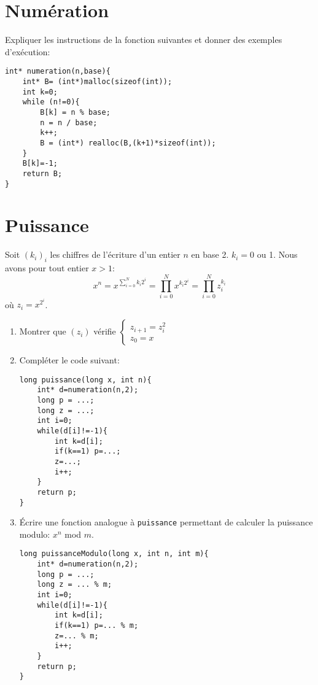\documentclass{article}
\begin{document}
\section*{Numération}
Expliquer les instructions de la fonction suivantes et donner des exemples d'exécution:

\begin{verbatim}
int* numeration(n,base){
    int* B= (int*)malloc(sizeof(int));
    int k=0;
    while (n!=0){
        B[k] = n % base;
        n = n / base;
        k++;
        B = (int*) realloc(B,(k+1)*sizeof(int));
    }
    B[k]=-1;
    return B;
}
\end{verbatim}
\section*{Puissance}
Soit $(k_i)_i$ les chiffres de l'écriture d'un entier $n$ en base 2. $k_i=0$ ou 1. Nous avons pour tout entier $x>1$:
\[x^n=x^{\sum_{i=0}^N k_i2^i}=\prod_{i=0}^N x^{k_i2^i}=\prod_{i=0}^N z_i^{k_i}\]
où $z_i=x^{2^i}$.
\begin{enumerate}
\item Montrer que $(z_i)$ vérifie $\left\{\begin{array}{l}
z_{i+1}=z_i^2\\z_0=x
\end{array}\right.$
\item Compléter le code suivant:
\begin{verbatim}
long puissance(long x, int n){
    int* d=numeration(n,2);
    long p = ...;
    long z = ...;
    int i=0;
    while(d[i]!=-1){
        int k=d[i];
        if(k==1) p=...;
        z=...;
        i++;
    }
    return p;
}
\end{verbatim}
\item Écrire une fonction analogue à {\tt puissance} permettant de calculer la puissance modulo: $x^n$ mod $m$.
\begin{verbatim}
long puissanceModulo(long x, int n, int m){
    int* d=numeration(n,2);
    long p = ...;
    long z = ... % m;
    int i=0;
    while(d[i]!=-1){
        int k=d[i];
        if(k==1) p=... % m;
        z=... % m;
        i++;
    }
    return p;
}
\end{verbatim}
\end{enumerate}
\end{document}
